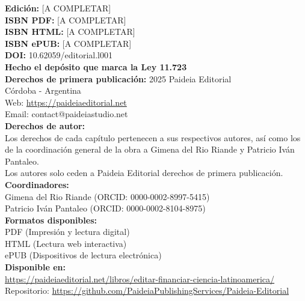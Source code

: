 \vspace{1cm}

\noindent\textbf{Edición:} [A COMPLETAR]\\
\textbf{ISBN PDF:} [A COMPLETAR]\\
\textbf{ISBN HTML:} [A COMPLETAR]\\
\textbf{ISBN ePUB:} [A COMPLETAR]\\
\textbf{DOI:} 10.62059/editorial.l001\\
\textbf{Hecho el depósito que marca la Ley 11.723}\\[1em]

\noindent\textbf{Derechos de primera publicación:} 2025 \quad Paideia Editorial\\
Córdoba - Argentina\\
Web: \url{https://paideiaeditorial.net}\\
Email: contact@paideiastudio.net\\[1em]

\noindent\textbf{Derechos de autor:}\\
Los derechos de cada capítulo pertenecen a sus respectivos autores, así como los de la coordinación general de la obra a Gimena del Rio Riande y Patricio Iván Pantaleo.\\
Los autores solo ceden a Paideia Editorial derechos de primera publicación.\\[1em]

\noindent\textbf{Coordinadores:}\\
Gimena del Rio Riande (ORCID: 0000-0002-8997-5415)\\
Patricio Iván Pantaleo (ORCID: 0000-0002-8104-8975)\\[1em]

\noindent\textbf{Formatos disponibles:}\\
PDF (Impresión y lectura digital)\\
HTML (Lectura web interactiva)\\
ePUB (Dispositivos de lectura electrónica)\\[1em]

\noindent\textbf{Disponible en:}\\
\url{https://paideiaeditorial.net/libros/editar-financiar-ciencia-latinoamerica/}\\
Repositorio: \url{https://github.com/PaideiaPublishingServices/Paideia-Editorial}\\[1em]

